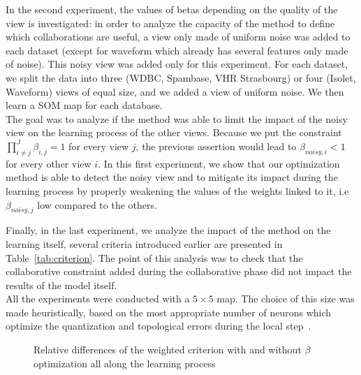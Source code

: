 In the second experiment, the values of betas depending on the quality of the view is investigated: in order to analyze the capacity of the method to define which collaborations are useful, a view only made of uniform noise was added to each dataset (except for waveform which already has several features only made of noise). This noisy view was added only for this experiment.
For each dataset, we split the data into three (WDBC, Spambase, VHR Strasbourg) or four (Isolet, Waveform) views of equal size, and we added a view of uniform noise. We then learn a SOM map for each database. \\
The goal was to analyze if the method was able to limit the impact of the noisy view on the learning process of the other views. Because we put the constraint $\prod_{i \neq j}^J \beta_{i,j} = 1$ for every view $j$, the previous assertion would lead to $\beta_{noisy,i} < 1$ for every other view $i$. In this first experiment, we show that our optimization method is able to detect the noisy view and to mitigate its impact during the learning process by properly weakening the values of the weights linked to it, i.e $\beta_{noisy, j}$ low compared to the others.


Finally, in the last experiment, we analyze the impact of the method on the learning itself, several criteria introduced earlier are presented in Table~\ref{tab:criterion}. The point of this analysis was to check that the collaborative constraint added during the collaborative phase did not impact the results of the model itself. \\

 

All the experiments were conducted with a $5\times5$ map. 
The choice of this size was made heuristically, based on the most appropriate number of neurons which optimize the quantization and topological errors during the local step~\cite{grozavu2010topological}.


\begin{figure}[!h]
	\centering

    \centering
	\caption{Relative differences of the weighted criterion with and without $\beta$ optimization all along the learning process}
\label{fig:relative_difference}
\end{figure}

